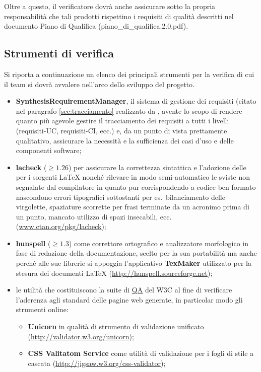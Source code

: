 {Oltre a questo, il verificatore dovrà anche assicurare sotto la propria responsabilità che tali prodotti rispettino i requisiti di qualità descritti nel documento Piano di Qualifica (piano\_di\_qualifica.2.0.pdf).

\subsection{Strumenti di verifica}\label{sec:tools}
Si riporta a continuazione un elenco dei principali strumenti per la verifica di cui il team si dovrà avvalere nell'arco dello sviluppo del progetto.
\begin{itemize}
  \item \textbf{SynthesisRequirementManager}, il sistema di gestione dei requisiti (citato nel paragrafo \ref{sec:tracciamento} realizzato da \team, avente lo scopo di rendere quanto più agevole gestire il tracciamento dei requisiti a tutti i livelli (requisiti-UC, requisiti-CI, ecc.) e, da un punto di vista prettamente qualitativo, assicurare la necessità e la sufficienza dei casi d'uso e delle componenti software;
 \item \textbf{lacheck} ($\geq 1.26$) per assicurare la correttezza sintattica e l'adozione delle  per i sorgenti \LaTeX{} nonché rilevare in modo semi-automatico le sviste non segnalate dal compilatore in quanto pur corrispondendo a codice ben formato nascondono errori tipografici sottostanti per es.~bilanciamento delle virgolette, spaziature scorrette per frasi terminate da un acronimo prima di un punto, mancato utilizzo di spazi insecabili, ecc. (\url{www.ctan.org/pkg/lacheck});
 \item \textbf{hunspell} ($\geq 1.3$) come correttore ortografico e analizzatore morfologico in fase di redazione della documentazione, scelto per la sua portabilità ma anche perché alle sue librerie si appoggia l'applicativo \textbf{TexMaker} utilizzato per la stesura dei documenti \LaTeX{} (\url{http://hunspell.sourceforge.net});
 \item le utilità che costituiscono la suite di \underline{QA} del W3C al fine di verificare l'aderenza agli standard delle pagine web generate, in particolar modo gli strumenti online:
 \begin{itemize}
   \item \textbf{Unicorn} in qualità di strumento di validazione unificato (\url{http://validator.w3.org/unicorn});
   \item \textbf{CSS Valitatom Service} come utilità di validazione per i fogli di stile a cascata (\url{http://jigsaw.w3.org/css-validator});

\end{itemize}
\end{itemize}}
